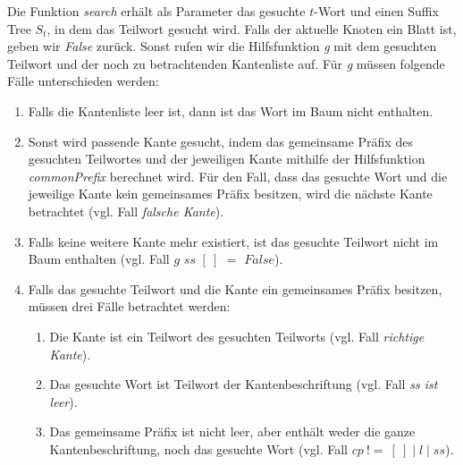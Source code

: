 \documentclass[12pt]{report}
\begin{document}
Die Funktion \textit{search} erhält als Parameter das gesuchte $t$-Wort und einen Suffix Tree $S_t$, in dem das Teilwort gesucht wird. Falls der aktuelle Knoten ein Blatt ist, geben wir \textit{False} zurück. Sonst rufen wir die Hilfsfunktion \textit{g} mit dem gesuchten Teilwort und der noch zu betrachtenden Kantenliste auf. Für \textit{g} müssen folgende Fälle unterschieden werden:
\begin{enumerate}
    \item Falls die Kantenliste leer ist, dann ist das Wort im Baum nicht enthalten.
    \item Sonst wird passende Kante gesucht, indem das gemeinsame Präfix des gesuchten Teilwortes und der jeweiligen Kante mithilfe der Hilfsfunktion \textit{commonPrefix} berechnet wird. Für den Fall, dass das gesuchte Wort und die jeweilige Kante kein gemeinsames Präfix besitzen, wird die nächste Kante betrachtet (vgl. Fall \textit{falsche Kante}).
    \item Falls keine weitere Kante mehr existiert, ist das gesuchte Teilwort nicht im Baum enthalten (vgl. Fall $g$ $ss$ $[\:]$ $=$ $False$).
    \item Falls das gesuchte Teilwort und die Kante ein gemeinsames Präfix besitzen, müssen drei Fälle betrachtet werden:
    \begin{enumerate}
        \item Die Kante ist ein Teilwort des gesuchten Teilworts (vgl. Fall \textit{richtige Kante}).
        \item Das gesuchte Wort ist Teilwort der Kantenbeschriftung (vgl. Fall \textit{ss ist leer}).
        \item Das gemeinsame Präfix ist nicht leer, aber enthält weder die ganze Kantenbeschriftung, noch das gesuchte Wort (vgl. Fall $cp\:!=\:[\:]\mid l \mid ss$).
    \end{enumerate}
\end{enumerate}




\end{document}
